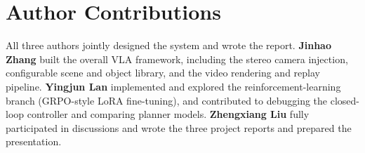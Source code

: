 \documentclass[conference]{IEEEtran}
\begin{document}
\section*{Author Contributions}

All three authors jointly designed the system and wrote the report. \textbf{Jinhao Zhang} built the overall VLA framework, including the stereo camera injection, configurable scene and object library, and the video rendering and replay pipeline. \textbf{Yingjun Lan} implemented and explored the reinforcement-learning branch (GRPO-style LoRA fine-tuning), and contributed to debugging the closed-loop controller and comparing planner models. \textbf{Zhengxiang Liu} fully participated in discussions and wrote the three project reports and prepared the presentation.
\end{document}
